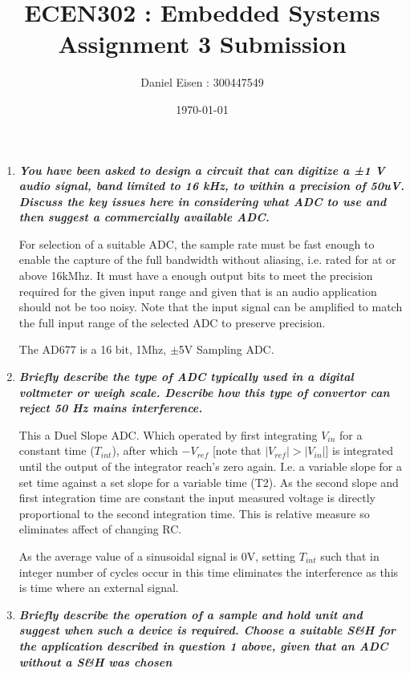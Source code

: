 \documentclass[11pt]{article}
\title{ECEN302 : Embedded Systems \\ Assignment 3 Submission}
\author{Daniel Eisen : 300447549}
\date{\today}
\begin{document}
\begin{preview}
    \maketitle
    \begin{enumerate}
        \item \textit{\textbf{You have been asked to design a circuit that can digitize a ±1 V audio signal, band limited to 16 kHz, to within a precision of 50uV. Discuss the key issues here in considering what ADC to use and then suggest a commercially available ADC.}}

              For selection of a suitable ADC, the sample rate must be fast enough to enable the capture of the full bandwidth without aliasing, i.e. rated for at or above 16kMhz. It must have a enough output bits to meet the precision required for the given input range and given that is an audio application should not be too noisy.
              Note that the input signal can be amplified to match the full input range of the selected ADC to preserve precision.

            The AD677 is a 16 bit, 1Mhz, $\pm$5V Sampling ADC.

        \item \textit{\textbf{Briefly describe the type of ADC typically used in a digital voltmeter or weigh scale. Describe how this type of convertor can reject 50 Hz mains interference.}}

              This a Duel Slope ADC. Which operated by first integrating $V_{in}$ for a constant time ($T_{int}$), after which $-V_{ref}$ [note that $|V_{ref}| > |V_{in}|$] is integrated until the output of the integrator reach's zero again. I.e. a variable slope for a set time against a set slope for a variable time (T2). As the second slope and first integration time are constant the input measured voltage is directly proportional to the second integration time. This is relative measure so eliminates affect of changing RC.

              As the average value of a sinusoidal signal is 0V, setting $T_{int}$ such that in integer number of cycles occur in this time eliminates the interference as this is time where an external signal.

        \item \textit{\textbf{Briefly describe the operation of a sample and hold unit and suggest when such a device is required. Choose a suitable S\&H for the application described in question 1 above, given that an ADC without a S\&H was chosen}}


\end{enumerate}
\end{preview}
\end{document}
